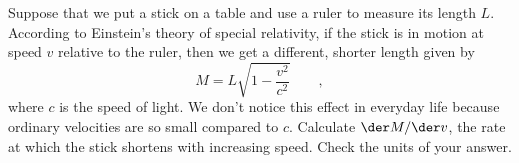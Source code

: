 Suppose that we put a stick on a table and use a ruler
to measure its length $L$.
According to Einstein's theory of special relativity,
if the stick is in motion at speed $v$ relative to the ruler, then
we get a different, shorter length given by
\begin{equation*}
  M = L\sqrt{1-\frac{v^2}{c^2}} \qquad ,
\end{equation*}
where $c$ is the speed of light. We don't notice this effect in
everyday life because ordinary velocities are so small compared
to $c$.
Calculate $\der M/\der v$, the rate at which the stick shortens
with increasing speed. Check the units of your answer.\answercheck
